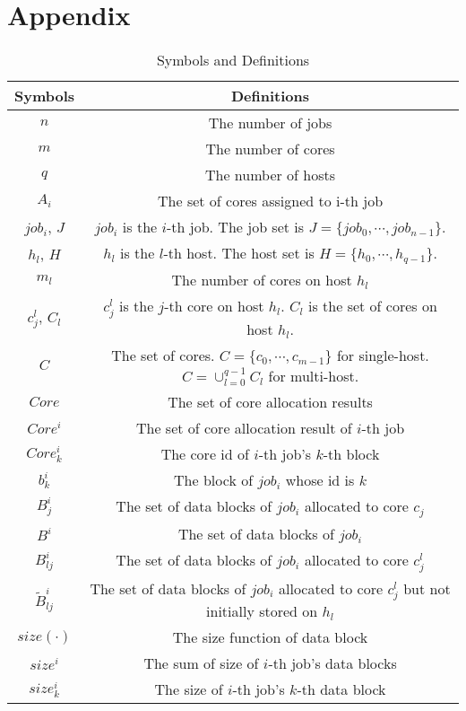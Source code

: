 \documentclass{article}
\begin{document}
\section{Appendix}
\begin{appendices}

\begin{table}[htbp]
\caption{Symbols and Definitions}
\begin{center}
\begin{tabular}{c|c}
\toprule
\textbf{Symbols} &\textbf{Definitions}  \\
\midrule
$n$ & The number of jobs  \\ 
$m$ & The number of cores \\
$q$ & The number of hosts  \\ 
$A_i$ & The set of cores assigned to i-th job  \\
$job_i$, $J$ & $job_i$ is the $i$-th job. The job set is $J=\{job_0, \cdots, job_{n-1}\}$. \\ 
$h_l$, $H$ & $h_l$ is the $l$-th  host. The host set is $H=\{h_0, \cdots, h_{q-1}\}$. \\ 
$m_l$ & The number of cores on host $h_l$\\
$c^l_j$, $C_l$ & $c^l_j$ is the $j$-th core on host $h_l$. $C_l$ is the set of cores on host $h_l$.\\ 
$C$ & The set of cores. $C=\{c_0,\cdots,c_{m-1}\}$ for single-host. $C=\cup_{l=0}^{q-1} C_l$ for multi-host.\\
$Core$ & The set of core allocation results\\
$Core^i$ & The set of core allocation result of $i$-th job\\
$Core^i_k$ & The core id of $i$-th job's $k$-th block\\
$b^i_k$& The block of $job_i$ whose id is $k$\\
$B^i_{j}$ & The set of data blocks of $job_i$ allocated to core $c_j$ \\
$B^i$ & The set of data blocks of $job_i$ \\ 
$B^i_{lj}$ & The set of data blocks of $job_i$ allocated to core $c^l_j$ \\
$\widetilde{B}^i_{lj}$ & The set of data blocks of $job_i$ allocated to core $c^l_j$ but not initially stored on $h_l$\\
$size(\cdot)$ & The size function of data block\\
$size^i$ & The sum of size of $i$-th job's data blocks\\
$size^i_k$ & The size of $i$-th job's $k$-th data block\\

\end{tabular}
\end{center}
\end{table}
\end{appendices}
\end{document}

